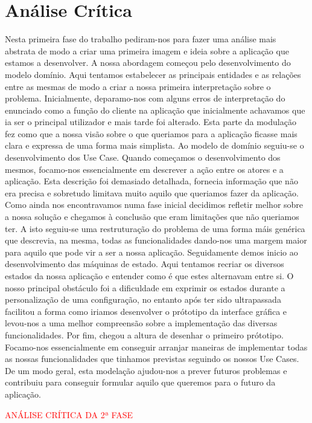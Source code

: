 \documentclass[11pt]{article} %
\begin{document}
\section{Análise Crítica}
Nesta primeira fase do trabalho pediram-nos para fazer uma análise mais abstrata de modo a criar uma primeira imagem e ideia sobre a aplicação que estamos a desenvolver. A nossa abordagem começou pelo desenvolvimento do modelo domínio. Aqui tentamos estabelecer as principais entidades e as relações entre as mesmas de modo a criar a nossa primeira interpretação sobre o problema. Inicialmente, deparamo-nos com alguns erros de interpretação do enunciado como a função do cliente na aplicação que inicialmente achavamos que ia ser o principal utilizador e mais tarde foi alterado. Esta parte da modulação fez como que a nossa visão sobre o que queriamos para a aplicação ficasse mais clara e expressa de uma forma mais simplista. Ao modelo de domínio seguiu-se o desenvolvimento dos Use Case. Quando começamos o desenvolvimento dos mesmos, focamo-nos essencialmente em descrever a ação entre os atores e a aplicação. Esta descrição foi demasiado detalhada, fornecia informação que não era precisa e sobretudo limitava muito aquilo que queriamos fazer da aplicação. Como ainda nos encontravamos numa fase inicial decidimos refletir melhor sobre a nossa solução e chegamos à conclusão que eram limitações que não queriamos ter. A isto seguiu-se uma restruturação do problema de uma forma máis genérica que descrevia, na mesma, todas as funcionalidades dando-nos uma margem maior para aquilo que pode vir a ser a nossa aplicação.
Seguidamente demos inicio ao desenvolvimento das máquinas de estado. Aqui tentamos recriar os diversos estados da nossa aplicação e entender como é que estes alternavam entre si. O nosso principal obstáculo foi a dificuldade em exprimir os estados durante a personalização de uma configuração, no entanto após ter sido ultrapassada facilitou a forma como iriamos desenvolver o prótotipo da interface gráfica e levou-nos a uma melhor compreensão sobre a implementação das diversas funcionalidades. Por fim, chegou a altura de desenhar o primeiro prótotipo. Focamo-nos essencialmente em conseguir arranjar maneiras de implementar todas as nossas funcionalidades que tinhamos previstas seguindo os nossos Use Cases. De um modo geral, esta modelação ajudou-nos a prever futuros problemas e contribuiu para conseguir formular aquilo que queremos para o futuro da aplicação.

\textcolor{red}{ANÁLISE CRÍTICA DA 2ª FASE}
\end{document}
